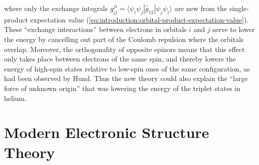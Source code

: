 where only the exchange integrals
\(
    g_{ij}^{ji}
    =
    \langle \psi_i\psi_j|\hat{g}_{12}|\psi_j\psi_i\rangle
\)
are new from the single-product expectation value
(\cref{eq:introduction:orbital-product-expectation-value}).
These ``exchange interactions'' between electrons in orbitals \(i\) and \(j\)
serve to lower the energy by cancelling out part of the Coulomb repulsion where
the orbitals overlap.
Moreover, the orthogonality of opposite spinors means that this effect only
takes place between electrons of the same spin, and thereby lowers the energy of
high-spin states relative to low-spin ones of the same configuration, as had
been observed by Hund.\cite{Hund:1925p345}
Thus the new theory could also explain the ``large force of unknown
origin''\cite{Mehra:1982} that was lowering the energy of the triplet states in
helium.


\section{Modern Electronic Structure Theory}


